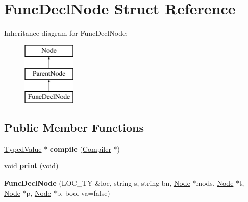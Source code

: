 \hypertarget{structFuncDeclNode}{}\section{Func\+Decl\+Node Struct Reference}
\label{structFuncDeclNode}
Inheritance diagram for Func\+Decl\+Node\+:\begin{figure}[H]
\begin{center}
\leavevmode
\includegraphics[height=3.000000cm]{structFuncDeclNode}
\end{center}
\end{figure}
\subsection*{Public Member Functions}
\begin{DoxyCompactItemize}
\item 
\mbox{\label{structFuncDeclNode_a3997d53a1b9f48bd3d3284d44e3f63f0}} 
\hyperlink{structTypedValue}{Typed\+Value} $\ast$ {\bfseries compile} (\hyperlink{structante_1_1Compiler}{Compiler} $\ast$)
\item 
\mbox{\label{structFuncDeclNode_a8ce85cdf353cccf90ebba10acb9fdcbe}} 
void {\bfseries print} (void)
\item 
\mbox{\label{structFuncDeclNode_a974ca2bce550c855dc27ea9aca5e2360}} 
{\bfseries Func\+Decl\+Node} (L\+O\+C\+\_\+\+TY \&loc, string s, string bn, \hyperlink{structNode}{Node} $\ast$mods, \hyperlink{structNode}{Node} $\ast$t, \hyperlink{structNode}{Node} $\ast$p, \hyperlink{structNode}{Node} $\ast$b, bool va=false)
\end{DoxyCompactItemize}
